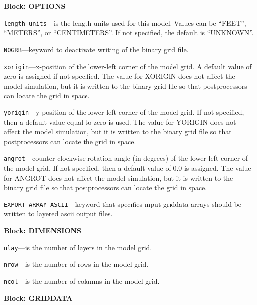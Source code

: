 
\item \textbf{Block: OPTIONS}

\begin{description}
\item \texttt{length\_units}---is the length units used for this model.  Values can be ``FEET'', ``METERS'', or ``CENTIMETERS''.  If not specified, the default is ``UNKNOWN''.

\item \texttt{NOGRB}---keyword to deactivate writing of the binary grid file.

\item \texttt{xorigin}---x-position of the lower-left corner of the model grid.  A default value of zero is assigned if not specified.  The value for XORIGIN does not affect the model simulation, but it is written to the binary grid file so that postprocessors can locate the grid in space.

\item \texttt{yorigin}---y-position of the lower-left corner of the model grid.  If not specified, then a default value equal to zero is used.  The value for YORIGIN does not affect the model simulation, but it is written to the binary grid file so that postprocessors can locate the grid in space.

\item \texttt{angrot}---counter-clockwise rotation angle (in degrees) of the lower-left corner of the model grid.  If not specified, then a default value of 0.0 is assigned.  The value for ANGROT does not affect the model simulation, but it is written to the binary grid file so that postprocessors can locate the grid in space.

\item \texttt{EXPORT\_ARRAY\_ASCII}---keyword that specifies input griddata arrays should be written to layered ascii output files.

\end{description}
\item \textbf{Block: DIMENSIONS}

\begin{description}
\item \texttt{nlay}---is the number of layers in the model grid.

\item \texttt{nrow}---is the number of rows in the model grid.

\item \texttt{ncol}---is the number of columns in the model grid.

\end{description}
\item \textbf{Block: GRIDDATA}

